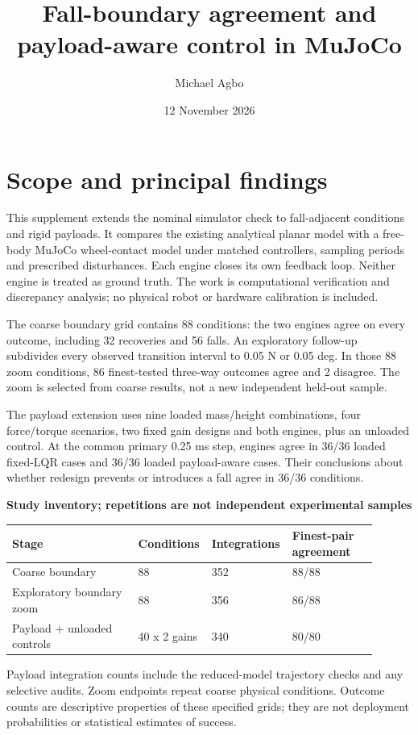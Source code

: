 \documentclass[11pt,a4paper]{article}
\title{Fall-boundary agreement and payload-aware control in MuJoCo}
\author{Michael Agbo}
\date{12 November 2026}
\begin{document}
\maketitle
\section*{Scope and principal findings}
This supplement extends the nominal simulator check to fall-adjacent conditions and rigid payloads. It compares the existing analytical planar model with a free-body MuJoCo wheel-contact model under matched controllers, sampling periods and prescribed disturbances. Each engine closes its own feedback loop. Neither engine is treated as ground truth. The work is computational verification and discrepancy analysis; no physical robot or hardware calibration is included.

The coarse boundary grid contains 88 conditions: the two engines agree on every outcome, including 32 recoveries and 56 falls. An exploratory follow-up subdivides every observed transition interval to 0.05 N or 0.05 deg. In those 88 zoom conditions, 86 finest-tested three-way outcomes agree and 2 disagree. The zoom is selected from coarse results, not a new independent held-out sample.

The payload extension uses nine loaded mass/height combinations, four force/torque scenarios, two fixed gain designs and both engines, plus an unloaded control. At the common primary 0.25 ms step, engines agree in 36/36 loaded fixed-LQR cases and 36/36 loaded payload-aware cases. Their conclusions about whether redesign prevents or introduces a fall agree in 36/36 conditions.

\textbf{Study inventory; repetitions are not independent experimental samples}
\begin{longtable}{p{0.342\linewidth}p{0.162\linewidth}p{0.162\linewidth}p{0.234\linewidth}}
\toprule
Stage & Conditions & Integrations & Finest-pair agreement \\ \midrule \endhead
Coarse boundary & 88 & 352 & 88/88 \\
Exploratory boundary zoom & 88 & 356 & 86/88 \\
Payload + unloaded controls & 40 x 2 gains & 340 & 80/80 \\
\bottomrule
\end{longtable}
Payload integration counts include the reduced-model trajectory checks and any selective audits. Zoom endpoints repeat coarse physical conditions. Outcome counts are descriptive properties of these specified grids; they are not deployment probabilities or statistical estimates of success.
\end{document}
